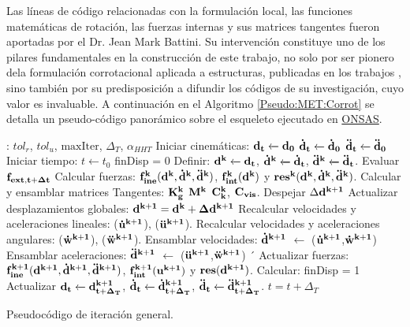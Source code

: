 Las líneas de código relacionadas con la formulación local, las funciones matemáticas de rotación, las fuerzas internas y sus matrices tangentes fueron aportadas por el Dr. Jean Mark Battini. Su intervención constituye uno de los pilares fundamentales en la construcción de este trabajo, no solo por ser pionero dela formulación corrotacional aplicada a estructuras, publicadas en los trabajos \citep{Battini2002} \citep{Le2014}, sino también por su predisposición a difundir los códigos de su investigación, cuyo valor es invaluable. A continuación en el Algoritmo \ref{Pseudo:MET:Corrot} se detalla un pseudo-código panorámico sobre el esqueleto ejecutado en \href{https://github.com/ONSAS/ONSAS/}{ONSAS}. 

\begin{algorithm}
	\begin{algorithmic} 
		\REQUIRE: $tol_r$, $tol_u$, $\text{maxIter}$, $\Delta_T$, $\alpha_{HHT}$
		\STATE Iniciar cinemáticas: $\bf{d_t}\xleftarrow[]{}\bf{d_0}$
		$\bf{\dot{d}_t}\xleftarrow[]{}\bf{\dot{d}_0}$
		$\bf{\ddot{d}_t}\xleftarrow[]{}\bf{\ddot{d}_0}$ 
		\STATE Iniciar tiempo: $t\xleftarrow{}t_0$
			\STATE finDisp = $0$
			\STATE Definir: $\bf{d^k}\xleftarrow[]{}\bf{d_t}$, $\bf{\dot{d}^k}\xleftarrow[]{}\bf{\dot{d}_t}$, $\bf{\ddot{d}^k}\xleftarrow[]{}\bf{\ddot{d}_t}$.
			\STATE Evaluar $\bf{f_{ext,t+\Delta t}}$	
				\STATE Calcular fuerzas: $\bf{f}_{ine}^k(\bf{d}^k,\bf{\dot{d}}^k,\bf{\ddot{d}}^k)$,  $\bf{f}_{int}^k(\bf{d}^k)$ y $\bf{res}^{k}(\bf{d}^k,\bf{\dot{d}}^k,\bf{\ddot{d}}^k)$. 
				\STATE Calcular y ensamblar matrices Tangentes: $\bf{K}_g^k$ $\bf{M}^k$  $\bf{C}_k^k$, $\bf{C}_{vis}$. 
				\STATE Despejar $\Delta \bf{d}^{k+1}$ 
				\STATE Actualizar desplazamientos globales:  $\bf{d}^{k+1} = \bf{d}^{k} + \Delta\bf{d}^{k+1}$ 
				\STATE Recalcular velocidades y aceleraciones lineales: ($\bf{\dot{u}}^{k+1}$), ($\bf{\ddot{u}}^{k+1}$).
				\STATE Recalcular velocidades y aceleraciones angulares: ($\bf{\dot{w}}^{k+1}$), ($\bf{\ddot{w}}^{k+1}$).
				\STATE Ensamblar velocidades: $\bf{\dot{d}}^{k+1}$ $\leftarrow$ ($\bf{\dot{u}}^{k+1}$,$\bf{\dot{w}}^{k+1}$)
				\STATE Ensamblar aceleraciones: $\bf{\ddot{d}}^{k+1}$ $\leftarrow$ ($\bf{\ddot{u}}^{k+1}$,$\bf{\ddot{w}}^{k+1}$)
´				\STATE Actualizar fuerzas: 	$\bf{f}_{ine}^{k+1}(\bf{d}^{k+1},\bf{\dot{d}}^{k+1},\bf{\ddot{d}}^{k+1})$,  $\bf{f}_{int}^{k+1}(\bf{u}^{k+1})$ y $\bf{res}(\bf{d}^{k+1})$. 
				\STATE Calcular: 
				\STATE finDisp = 1
				\ENDIF
			\ENDWHILE
			\STATE Actualizar $\bf{d_{t}}\xleftarrow[]{}\bf{d^{k+1}_{t+\Delta_T}}$, $\bf{\dot{d}_{t}}\xleftarrow[]{}\bf{\dot{d}^{k+1}_{t+\Delta_T}}$, $\bf{\ddot{d}_t}\xleftarrow[]{}\bf{\ddot{d}^{k+1}_{t+\Delta_T}}$.
			\STATE $t = t+\Delta_T$	
 		\ENDWHILE
	\end{algorithmic}
\caption{Pseudocódigo de iteración general. }
\label{Pseudo:MET:Corrot}
\end{algorithm}


